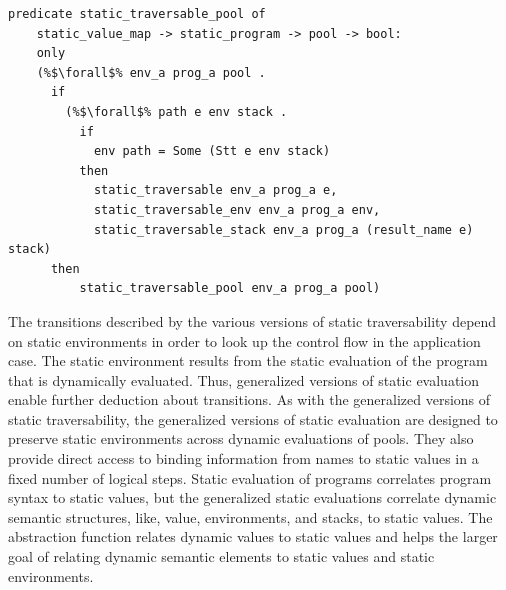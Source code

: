\documentclass{article}
\begin{document}
\begin{lstlisting}[language=logic, escapechar=\%]
  predicate static_traversable_pool of
    static_value_map -> static_program -> pool -> bool:
    only
    (%$\forall$% env_a prog_a pool .
      if
        (%$\forall$% path e env stack .
          if
            env path = Some (Stt e env stack)
          then 
            static_traversable env_a prog_a e, 
            static_traversable_env env_a prog_a env, 
            static_traversable_stack env_a prog_a (result_name e) stack) 
      then
          static_traversable_pool env_a prog_a pool)
  \end{lstlisting}

The transitions described by the various versions of static traversability depend on static
environments in order to look up the control flow in the application case.
The static environment
results from the static evaluation of the program that is dynamically evaluated. Thus,
generalized
versions of static evaluation enable further deduction about transitions.
As with the generalized versions of static traversability,
the generalized versions of static evaluation are designed to
preserve static environments across
dynamic evaluations of pools. They also provide direct access to binding information from names
to static values in a fixed number of logical steps. Static evaluation of programs correlates
program syntax to static values, but the generalized static evaluations correlate dynamic
semantic structures, like, value, environments, and stacks, to static values. The abstraction
function relates dynamic values to static values and helps the larger goal of relating dynamic
semantic elements to static values and static environments.    
\end{document}
